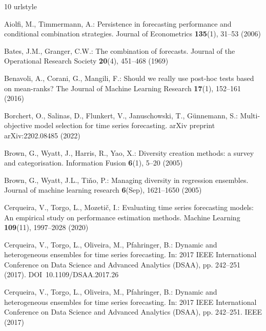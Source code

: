 \documentclass[smallcondensed]{svjour3}
\begin{document}
\begin{thebibliography}{10}
\providecommand{\url}[1]{{#1}}
\providecommand{\urlprefix}{URL }
\expandafter\ifx\csname urlstyle\endcsname\relax
  \providecommand{\doi}[1]{DOI~\discretionary{}{}{}#1}\else
  \providecommand{\doi}{DOI~\discretionary{}{}{}\begingroup
  \urlstyle{rm}\Url}\fi

Aiolfi, M., Timmermann, A.: Persistence in forecasting performance and
  conditional combination strategies.
\newblock Journal of Econometrics \textbf{135}(1), 31--53 (2006)

Bates, J.M., Granger, C.W.: The combination of forecasts.
\newblock Journal of the Operational Research Society \textbf{20}(4), 451--468
  (1969)

Benavoli, A., Corani, G., Mangili, F.: Should we really use post-hoc tests
  based on mean-ranks?
\newblock The Journal of Machine Learning Research \textbf{17}(1), 152--161
  (2016)

Borchert, O., Salinas, D., Flunkert, V., Januschowski, T., G{\"u}nnemann, S.:
  Multi-objective model selection for time series forecasting.
\newblock arXiv preprint arXiv:2202.08485  (2022)

Brown, G., Wyatt, J., Harris, R., Yao, X.: Diversity creation methods: a survey
  and categorisation.
\newblock Information Fusion \textbf{6}(1), 5--20 (2005)

Brown, G., Wyatt, J.L., Ti{\v{n}}o, P.: Managing diversity in regression
  ensembles.
\newblock Journal of machine learning research \textbf{6}(Sep), 1621--1650
  (2005)

Cerqueira, V., Torgo, L., Mozeti{\v{c}}, I.: Evaluating time series forecasting
  models: An empirical study on performance estimation methods.
\newblock Machine Learning \textbf{109}(11), 1997--2028 (2020)

Cerqueira, V., Torgo, L., Oliveira, M., Pfahringer, B.: Dynamic and
  heterogeneous ensembles for time series forecasting.
\newblock In: 2017 IEEE International Conference on Data Science and Advanced
  Analytics (DSAA), pp. 242--251 (2017).
\newblock \doi{10.1109/DSAA.2017.26}

Cerqueira, V., Torgo, L., Oliveira, M., Pfahringer, B.: Dynamic and
  heterogeneous ensembles for time series forecasting.
\newblock In: 2017 IEEE International Conference on Data Science and Advanced
  Analytics (DSAA), pp. 242--251. IEEE (2017)


\end{thebibliography}
\end{document}
